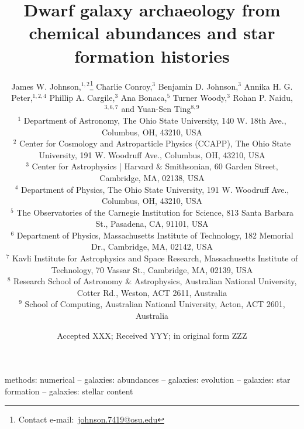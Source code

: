 \documentclass[fleqn, usenatbib]{mnras}
\title[Dwarf Galaxy Archaeology]{Dwarf galaxy archaeology from chemical
abundances and star formation histories}
\author[J.W. Johnson et al.]{James W. Johnson,$^{1, 2}$\thanks{
	Contact e-mail:~\href{mailto:johnson.7419@osu.edu}{johnson.7419@osu.edu}}
	Charlie Conroy,$^{3}$
	Benjamin D. Johnson,$^{3}$
	Annika H. G. Peter,$^{1, 2, 4}$
	\newauthor
	Phillip A. Cargile,$^{3}$
	Ana Bonaca,$^{5}$
	Turner Woody,$^{3}$
	Rohan P. Naidu,$^{3, 6, 7}$
	and Yuan-Sen Ting$^{8, 9}$
	\\
	$^{1}$ Department of Astronomy, The Ohio State University,
	140 W. 18th Ave., Columbus, OH, 43210, USA
	\\
	$^{2}$ Center for Cosmology and Astroparticle Physics (CCAPP),
	The Ohio State University, 191 W. Woodruff Ave., Columbus, OH, 43210, USA
	\\
	$^{3}$ Center for Astrophysics | Harvard \& Smithsonian, 60 Garden Street,
	Cambridge, MA, 02138, USA
	\\
	$^{4}$ Department of Physics, The Ohio State University, 191 W. Woodruff
	Ave., Columbus, OH, 43210, USA
	\\
	$^{5}$ The Observatories of the Carnegie Institution for Science, 813 Santa
	Barbara St., Pasadena, CA, 91101, USA
	\\
	$^{6}$ Department of Physics, Massachusetts Institute of Technology, 182
	Memorial Dr., Cambridge, MA, 02142, USA
	\\
	$^{7}$ Kavli Institute for Astrophysics and Space Research, Massachusetts
	Institute of Technology, 70 Vassar St., Cambridge, MA, 02139, USA
	\\
	$^{8}$ Research School of Astronomy \& Astrophysics, Australian National
	University, Cotter Rd., Weston, ACT 2611, Australia
	\\
	$^{9}$ School of Computing, Australian National University, Acton, ACT
	2601, Australia
}
\date{Accepted XXX; Received YYY; in original form ZZZ}
\begin{document}
\label{firstpage}
\pagerange{\pageref{firstpage}--\pageref{lastpage}}
\maketitle



\begin{keywords}
methods: numerical -- galaxies: abundances -- galaxies: evolution --
galaxies: star formation -- galaxies: stellar content
\end{keywords}













\begin{appendices}


\end{appendices}

\label{lastpage}
\end{document}
